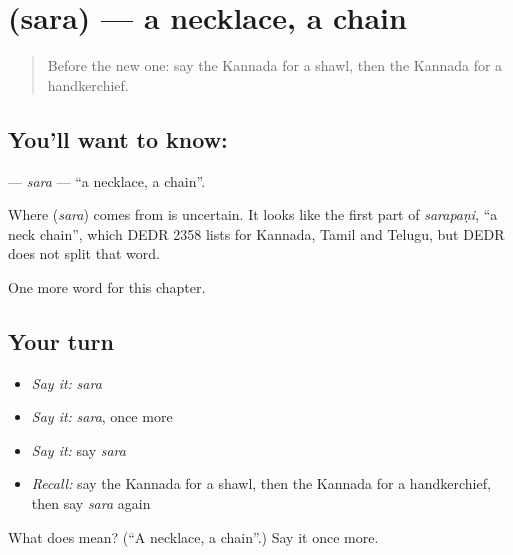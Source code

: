 \section[\texorpdfstring{\kn{ಸರ} (sara)}{ಸರ (sara)}]{ (sara) — a necklace, a chain}

\label{lesson:KA-C259-sara}



\begin{quote}
Before the new one: say the Kannada for a shawl, then the Kannada for a handkerchief.
\end{quote}

\subsection*{You'll want to know: }
\textbf{} — \emph{sara} — \textquotedblleft{}a necklace, a chain\textquotedblright{}.

\begin{cousinweb}
Where \textbf{} (\emph{sara}) comes from is uncertain. It looks like the first part of \emph{sarapaṇi}, \textquotedblleft{}a neck chain\textquotedblright{}, which DEDR 2358 lists for Kannada, Tamil and Telugu, but DEDR does not split that word.
\end{cousinweb}

\begin{grammarlens}[title={What you've built}]
One more word for this chapter.
\end{grammarlens}

\subsection*{Your turn}
\begin{itemize}
\raggedright
  \item \emph{Say it:} \emph{sara}
  \item \emph{Say it:} \emph{sara}, once more
  \item \emph{Say it:} say \emph{sara}
  \item \emph{Recall:} say the Kannada for a shawl, then the Kannada for a handkerchief, then say \emph{sara} again
\end{itemize}

\begin{tcolorbox}[breakable,colback=teal!4,colframe=teal!35!black,title={Before you move on}]
What does  mean? (\textquotedblleft{}A necklace, a chain\textquotedblright{}.) Say it once more.
\end{tcolorbox}
